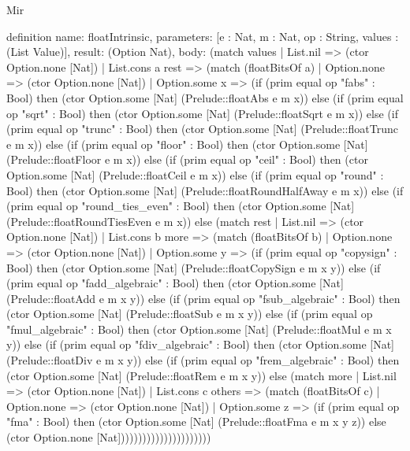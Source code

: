 \begin{lexlean}{Mir}
\begin{semanticmodule}
definition{
  name: floatIntrinsic,
  parameters: [e : Nat, m : Nat, op : String, values : (List Value)],
  result: (Option Nat),
  body: (match values
    | List.nil => (ctor Option.none [Nat])
    | List.cons a rest => (match (floatBitsOf a)
      | Option.none => (ctor Option.none [Nat])
      | Option.some x => (if (prim equal op "fabs" : Bool) then (ctor Option.some [Nat] (Prelude::floatAbs e m x)) else (if (prim equal op "sqrt" : Bool) then (ctor Option.some [Nat] (Prelude::floatSqrt e m x)) else (if (prim equal op "trunc" : Bool) then (ctor Option.some [Nat] (Prelude::floatTrunc e m x)) else (if (prim equal op "floor" : Bool) then (ctor Option.some [Nat] (Prelude::floatFloor e m x)) else (if (prim equal op "ceil" : Bool) then (ctor Option.some [Nat] (Prelude::floatCeil e m x)) else (if (prim equal op "round" : Bool) then (ctor Option.some [Nat] (Prelude::floatRoundHalfAway e m x)) else (if (prim equal op "round_ties_even" : Bool) then (ctor Option.some [Nat] (Prelude::floatRoundTiesEven e m x)) else (match rest
        | List.nil => (ctor Option.none [Nat])
        | List.cons b more => (match (floatBitsOf b)
          | Option.none => (ctor Option.none [Nat])
          | Option.some y => (if (prim equal op "copysign" : Bool) then (ctor Option.some [Nat] (Prelude::floatCopySign e m x y)) else (if (prim equal op "fadd_algebraic" : Bool) then (ctor Option.some [Nat] (Prelude::floatAdd e m x y)) else (if (prim equal op "fsub_algebraic" : Bool) then (ctor Option.some [Nat] (Prelude::floatSub e m x y)) else (if (prim equal op "fmul_algebraic" : Bool) then (ctor Option.some [Nat] (Prelude::floatMul e m x y)) else (if (prim equal op "fdiv_algebraic" : Bool) then (ctor Option.some [Nat] (Prelude::floatDiv e m x y)) else (if (prim equal op "frem_algebraic" : Bool) then (ctor Option.some [Nat] (Prelude::floatRem e m x y)) else (match more
            | List.nil => (ctor Option.none [Nat])
            | List.cons c others => (match (floatBitsOf c)
              | Option.none => (ctor Option.none [Nat])
              | Option.some z => (if (prim equal op "fma" : Bool) then (ctor Option.some [Nat] (Prelude::floatFma e m x y z)) else (ctor Option.none [Nat])))))))))))))))))))))
}


\end{semanticmodule}
\end{lexlean}
